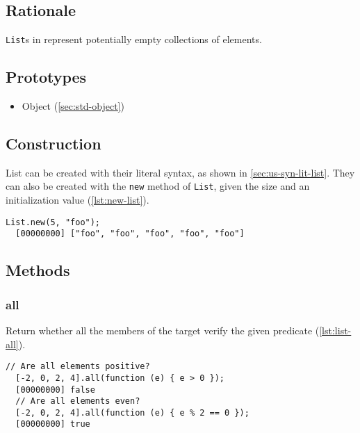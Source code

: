\subsection{Rationale}

\lstinline|List|s in \us represent potentially empty collections of
elements.

\subsection{Prototypes}

\begin{itemize}
\item Object (\autoref{sec:std-object})
\end{itemize}

\subsection{Construction}

List can be created with their literal syntax, as shown in
\autoref{sec:us-syn-lit-list}. They can also be created with the
\lstinline|new| method of \lstinline|List|, given the size and an
initialization value (\autoref{lst:new-list}).

\begin{lstlisting}[caption=List.new, label=lst:new-list,
  float=\floatposh]
  List.new(5, "foo");
  [00000000] ["foo", "foo", "foo", "foo", "foo"]
\end{lstlisting}

\subsection{Methods}

\subsubsection{all}

Return whether all the members of the target verify the given
predicate (\autoref{lst:list-all}).

\begin{lstlisting}[caption=List.all, label=lst:list-all, float=\floatposh]
  // Are all elements positive?
  [-2, 0, 2, 4].all(function (e) { e > 0 });
  [00000000] false
  // Are all elements even?
  [-2, 0, 2, 4].all(function (e) { e % 2 == 0 });
  [00000000] true
\end{lstlisting}


